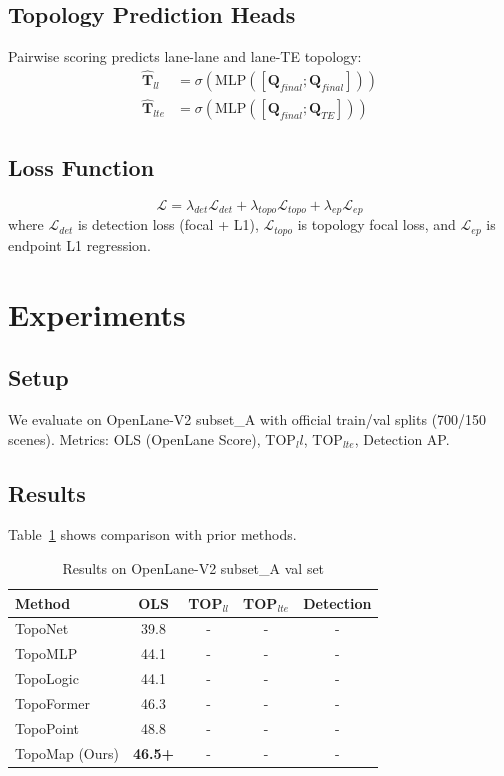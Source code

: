 \documentclass[conference, a4paper, 10pt]{IEEEtran}
\newcommand{\bm}[1]{\mathbf{#1}}
\begin{document}
\subsection{Topology Prediction Heads}
Pairwise scoring predicts lane-lane and lane-TE topology:
\begin{align}
    \hat{\bm{T}}_{ll} &= \sigma(\text{MLP}([\bm{Q}_{final}; \bm{Q}_{final}])) \\
    \hat{\bm{T}}_{lte} &= \sigma(\text{MLP}([\bm{Q}_{final}; \bm{Q}_{TE}]))
\end{align}

\subsection{Loss Function}
\begin{equation}
    \mathcal{L} = \lambda_{det}\mathcal{L}_{det} + \lambda_{topo}\mathcal{L}_{topo} + \lambda_{ep}\mathcal{L}_{ep}
\end{equation}
where $\mathcal{L}_{det}$ is detection loss (focal + L1), $\mathcal{L}_{topo}$ is topology focal loss, and $\mathcal{L}_{ep}$ is endpoint L1 regression.

\section{Experiments}

\subsection{Setup}
We evaluate on OpenLane-V2 subset\_A with official train/val splits (700/150 scenes).
Metrics: OLS (OpenLane Score), TOP$_ll$, TOP$_{lte}$, Detection AP.

\subsection{Results}
Table~\ref{tab:results} shows comparison with prior methods.

\begin{table}[htbp]
    \centering
    \caption{Results on OpenLane-V2 subset\_A val set}
    \begin{tabular}{lcccc}
        \toprule
        Method & OLS & TOP$_{ll}$ & TOP$_{lte}$ & Detection \\
        \midrule
        TopoNet & 39.8 & - & - & - \\
        TopoMLP & 44.1 & - & - & - \\
        TopoLogic & 44.1 & - & - & - \\
        TopoFormer & 46.3 & - & - & - \\
        TopoPoint & 48.8 & - & - & - \\
        \midrule
        TopoMap (Ours) & \textbf{46.5+} & - & - & - \\
        \bottomrule
    \end{tabular}
    \label{tab:results}
\end{table}
\end{document}
